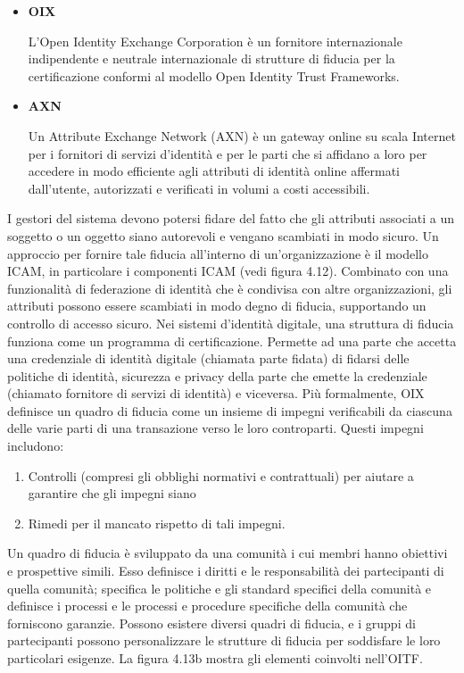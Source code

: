 \begin{itemize}
    \item \textbf{OIX}
    
    L'Open Identity Exchange Corporation è un fornitore internazionale indipendente e neutrale internazionale di strutture di fiducia per la certificazione conformi al modello Open Identity Trust Frameworks.
    
    \item \textbf{AXN}
    
    Un Attribute Exchange Network (AXN) è un gateway online su scala Internet per i fornitori di servizi d'identità e per le parti che si affidano a loro per accedere in modo efficiente agli attributi di identità online affermati dall'utente, autorizzati e verificati in volumi a costi accessibili.

    
\end{itemize}
I gestori del sistema devono potersi fidare del fatto che gli attributi associati a un soggetto o un oggetto siano autorevoli e vengano scambiati in modo sicuro. Un approccio per fornire tale fiducia all'interno di un'organizzazione è il modello ICAM, in particolare i componenti ICAM (vedi figura 4.12). Combinato con una funzionalità di federazione di identità che è condivisa con altre organizzazioni, gli attributi possono essere scambiati in modo degno di fiducia, supportando un controllo di accesso sicuro. Nei sistemi d'identità digitale, una struttura di fiducia funziona come un programma di certificazione. Permette ad una parte che accetta una credenziale di identità digitale (chiamata parte fidata) di fidarsi delle politiche di identità, sicurezza e privacy della parte che emette la credenziale (chiamato fornitore di servizi di identità) e viceversa.
\singlespacing
Più formalmente, OIX definisce un quadro di fiducia come un insieme di impegni verificabili da ciascuna delle varie parti di una transazione verso le loro controparti.
\singlespacing
Questi impegni includono:
\begin{enumerate}
    \item Controlli (compresi gli obblighi normativi e contrattuali) per aiutare a garantire che gli impegni siano
    
    \item Rimedi per il mancato rispetto di tali impegni.
\end{enumerate}
Un quadro di fiducia è sviluppato da una comunità i cui membri hanno obiettivi e prospettive simili. Esso definisce i diritti e le responsabilità dei partecipanti di quella comunità; specifica le politiche e gli standard specifici della comunità e definisce i processi e le processi e procedure specifiche della comunità che forniscono garanzie. Possono esistere diversi quadri di fiducia, e i gruppi di partecipanti possono personalizzare le strutture di fiducia per soddisfare le loro particolari esigenze. La figura 4.13b mostra gli elementi coinvolti nell'OITF.
